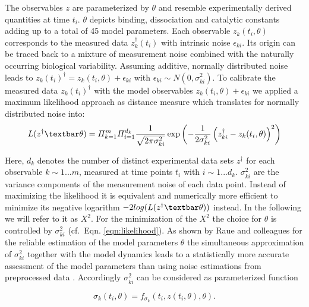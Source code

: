 The observables $z$ are parameterized by $\theta$ and resemble experimentally derived quantities at time $t_i$. $\theta$ depicts binding, dissociation and catalytic constants adding up to a total of 45 model parameters. Each observable $z_k(t_i,\theta)$ corresponds to the measured data $z_k^\dag(t_i)$ with intrinsic noise $\epsilon_{ki}$. Its origin can be traced back to a mixture of measurement noise combined with the naturally occurring biological variability. Assuming additive, normally distributed noise leads to $z_k(t_i)^\dag = z_k(t_i,\theta) + \epsilon_{ki}$ with $\epsilon_{ki} \sim N(0,\sigma_{ki}^2)$. To calibrate the measured data $z_k(t_i)^\dag$ with the model observables $z_k(t_i,\theta)+\epsilon_{ki}$ we applied a maximum likelihood approach as distance measure which translates for normally distributed noise into:
\begin{equation}
\label{eqn:likelihood}
L(z^\dag \textbar \theta) = \varPi_{k=1}^m \varPi_{i=1}^{d_k} \frac{1}{\sqrt{2\pi \sigma_{ki}^2}}\exp \left( -\frac{1}{2\sigma_{ki}^2}\left(z_{ki}^\dag - z_k(t_i,\theta)\right)^2\right)
\end{equation}
  
Here, $d_k$ denotes the number of distinct experimental data sets $z^\dag$ for each observable $k\sim 1 ...m$, measured at time points $t_i$ with $i\sim 1 ... d_k$. $\sigma_{ki}^2$ are the variance components of the measurement noise of each data point. Instead of maximizing the likelihood it is equivalent and numerically more efficient to minimize its negative logarithm $-2log(L(z^\dag\textbar\theta))$ instead. In the following we will refer to it as $X^2$.  For the minimization of the $X^2$ the choice for $\theta$ is controlled by $\sigma_{ki}^2$ (cf.\ Eqn. \ref{eqn:likelihood}). As shown by Raue and colleagues for the reliable estimation of the model parameters $\theta$ the simultaneous approximation of $\sigma_{ki}^2$ together with the model dynamics leads to a statistically more accurate assessment of the model parameters than using noise estimations from preprocessed data \cite{Raue2013}. Accordingly $\sigma_{ki}^2$ can be considered as parameterized function

\begin{equation}
\sigma_{k}(t_i,\theta) = f_{\sigma_{k}}(t_i,z(t_i,\theta),\theta).
\end{equation}    

